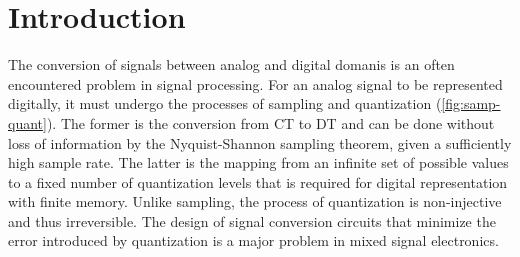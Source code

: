 
\chapter{Introduction}
\label{ch:Introduction}

The conversion of signals between analog and digital domanis is an often encountered problem in signal processing. For an analog signal to be represented digitally, it must undergo the processes of sampling and quantization (\autoref{fig:samp-quant}). The former is the conversion from \gls{CT} to \gls{DT} and can be done without loss of information by the Nyquist-Shannon sampling theorem, given a sufficiently high sample rate. The latter is the mapping from an infinite set of possible values to a fixed number of quantization levels that is required for digital representation with finite memory. Unlike sampling, the process of quantization is non-injective and thus irreversible. The design of signal conversion circuits that minimize the error introduced by quantization is a major problem in mixed signal electronics.

